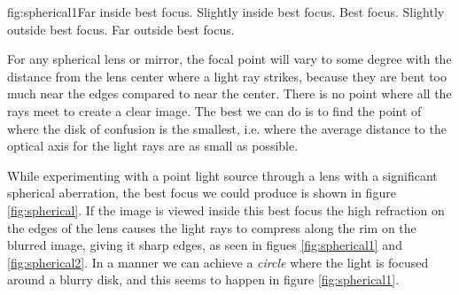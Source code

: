       {fig:spherical1}{Far inside best focus.}
      {Slightly inside best focus.}
      {Best focus.}
      {Slightly outside best focus.}
      {Far outside best focus.}

For any spherical lens or mirror, the focal point will vary to some degree with 
the distance from the lens center where a light ray strikes, because they are 
bent too much near the edges compared to near the center. There is no point 
where all the rays meet to create a clear image. The best we can do is to find 
the point of where the disk of confusion is the smallest, i.e. where the 
average distance to the optical axis for the light rays are as small as 
possible.

While experimenting with a point light source through a lens with a significant 
spherical aberration, the best focus we could produce is shown in figure 
\vref{fig:spherical}. If the image is viewed inside this best focus the high 
refraction on the edges of the lens causes the light rays to compress along the 
rim on the blurred image, giving it sharp edges, as seen in figues 
\vref{fig:spherical1} and \vref{fig:spherical2}. In a manner we can achieve a 
\emph{circle} where the light is focused around a blurry disk, and this seems 
to happen in figure \ref{fig:spherical1}.